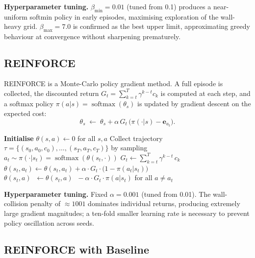 \documentclass[11pt]{article}
\begin{document}
\textbf{Hyperparameter tuning.}  $\beta_{\min}=0.01$ (tuned from 0.1) produces
a near-uniform softmin policy in early episodes, maximising exploration of the
wall-heavy grid.  $\beta_{\max}=7.0$ is confirmed as the best upper limit,
approximating greedy behaviour at convergence without sharpening prematurely.

\subsection{REINFORCE}

REINFORCE is a Monte-Carlo policy gradient method.  A full episode is collected,
the discounted return $G_t = \sum_{k=t}^{T}\gamma^{k-t}c_k$
is computed at each step, and a softmax policy
$\pi(a|s)=\operatorname{softmax}(\theta_s)$ is updated by gradient descent on
the expected cost:
\begin{equation}
    \theta_s \;\leftarrow\; \theta_s + \alpha\, G_t\,\bigl(\pi(\cdot|s) - \mathbf{e}_{a_t}\bigr).
\end{equation}

\begin{algorithm}[H]
\caption{REINFORCE}
\label{alg:reinforce}
\begin{algorithmic}[1]
\State \textbf{Initialise} $\theta(s,a)\leftarrow 0$ for all $s,a$
    \State Collect trajectory $\tau = \{(s_0,a_0,c_0),\ldots,(s_T,a_T,c_T)\}$
           by sampling $a_t \sim \pi(\cdot|s_t) = \operatorname{softmax}(\theta(s_t,\cdot))$
        \State $G_t \leftarrow \sum_{k=t}^{T} \gamma^{k-t}\, c_k$
        \State $\theta(s_t,a_t) \leftarrow \theta(s_t,a_t) + \alpha\cdot G_t\cdot\bigl(1-\pi(a_t|s_t)\bigr)$
        \State $\theta(s_t,a)\;\; \leftarrow \theta(s_t,a)\;\; - \alpha\cdot G_t\cdot\pi(a|s_t)$
               \hfill for all $a\neq a_t$
    \EndFor
\EndFor
\end{algorithmic}
\end{algorithm}

\textbf{Hyperparameter tuning.}  Fixed $\alpha=0.001$ (tuned from 0.01).  The
wall-collision penalty of ${\approx}1001$ dominates individual returns, producing
extremely large gradient magnitudes; a ten-fold smaller learning rate is
necessary to prevent policy oscillation across seeds.

\subsection{REINFORCE with Baseline}
\end{document}

